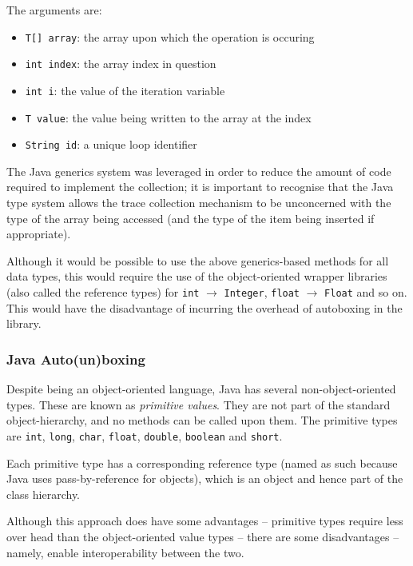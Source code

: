 	The arguments are:
	
	\begin{itemize} \label{items:trace-args}
		\item \texttt{T[] array}: the array upon which the operation is occuring
		\item \texttt{int index}: the array index in question
		\item \texttt{int i}: the value of the iteration variable
		\item \texttt{T value}: the value being written to the array at the index
		\item \texttt{String id}: a unique loop identifier
	\end{itemize}
	
	The Java generics system was leveraged in order to reduce the amount of code required to implement the collection; it is important to recognise that the Java type system allows the trace collection mechanism to be unconcerned with the type of the array being accessed (and the type of the item being inserted if appropriate).
	
	Although it would be possible to use the above generics-based methods for all data types, this would require the use of the object-oriented wrapper libraries (also called the reference types) for \texttt{int} $\rightarrow$ \texttt{Integer}, \texttt{float} $\rightarrow$ \texttt{Float} and so on. This would have the disadvantage of incurring the overhead of autoboxing \citep{boxing} in the library.
	
		\subsubsection{Java Auto(un)boxing} \label{sec:runtime/implementation/instrument/boxing}
		Despite being an object-oriented language, Java has several non-object-oriented types. These are known as \textit{primitive values}. They are not part of the standard object-hierarchy, and no methods can be called upon them. The primitive types are \texttt{int}, \texttt{long}, \texttt{char}, \texttt{float}, \texttt{double}, \texttt{boolean} and \texttt{short}.
		
		Each primitive type has a corresponding reference type (named as such because Java uses pass-by-reference for objects), which is an object and hence part of the class hierarchy.
		
		Although this approach does have some advantages -- primitive types require less over head than the object-oriented value types -- there are some disadvantages -- namely, enable interoperability between the two.
		
